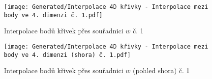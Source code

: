 \begin{imagepage}
    \begin{figure}[H]
        \centering
        \texttt{[image: Generated/Interpolace 4D křivky - Interpolace mezi body ve 4. dimenzi č. 1.pdf]}
        \caption{Interpolace bodů křivek přes souřadnici $w$ č. 1}
        \label{fig:Demo 4D Interpolace mezi body přes souřadnici w 1}
    \end{figure}
    \begin{figure}[H]
        \centering
        \texttt{[image: Generated/Interpolace 4D křivky - Interpolace mezi body ve 4. dimenzi (shora) č. 1.pdf]}
        \caption{Interpolace bodů křivek přes souřadnici $w$ (pohled shora) č. 1}
        \label{fig:Demo 4D Interpolace mezi body přes souřadnici w shora 1}
    \end{figure}
\end{imagepage}

